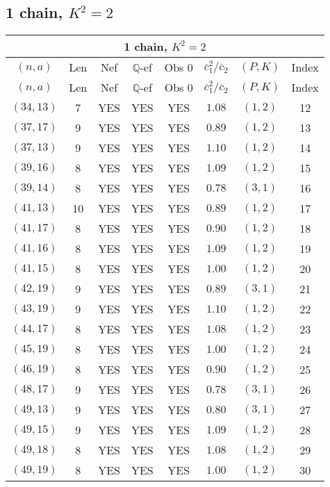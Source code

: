 \subsection{1 chain, $K^2 = 2$}
\begin{longtable}{|c|c|c|c|c|c|c|c|}
\hline
\multicolumn{8}{|c|}{1 chain, $K^2 = 2$}\\
\hline
$(n,a)$ & Len & Nef & $\mathbb Q$-ef & Obs 0 & $\overline c_1^2 / \overline c_2$ & $(P,K)$ & Index\\
\hline
\endfirsthead

\hline
$(n,a)$ & Len & Nef & $\mathbb Q$-ef & Obs 0 & $\overline c_1^2 / \overline c_2$ & $(P,K)$ & Index\\
\hline
\endhead
\hline
\endfoot

$(34,13)$ & 7 & YES & YES & YES & $1.08$ & $(1,2)$ & 12\\
$(37,17)$ & 9 & YES & YES & YES & $0.89$ & $(1,2)$ & 13\\
$(37,13)$ & 9 & YES & YES & YES & $1.10$ & $(1,2)$ & 14\\
$(39,16)$ & 8 & YES & YES & YES & $1.09$ & $(1,2)$ & 15\\
$(39,14)$ & 8 & YES & YES & YES & $0.78$ & $(3,1)$ & 16\\
$(41,13)$ & 10 & YES & YES & YES & $0.89$ & $(1,2)$ & 17\\
$(41,17)$ & 8 & YES & YES & YES & $0.90$ & $(1,2)$ & 18\\
$(41,16)$ & 8 & YES & YES & YES & $1.09$ & $(1,2)$ & 19\\
$(41,15)$ & 8 & YES & YES & YES & $1.00$ & $(1,2)$ & 20\\
$(42,19)$ & 9 & YES & YES & YES & $0.89$ & $(3,1)$ & 21\\
$(43,19)$ & 9 & YES & YES & YES & $1.10$ & $(1,2)$ & 22\\
$(44,17)$ & 8 & YES & YES & YES & $1.08$ & $(1,2)$ & 23\\
$(45,19)$ & 8 & YES & YES & YES & $1.00$ & $(1,2)$ & 24\\
$(46,19)$ & 8 & YES & YES & YES & $0.90$ & $(1,2)$ & 25\\
$(48,17)$ & 9 & YES & YES & YES & $0.78$ & $(3,1)$ & 26\\
$(49,13)$ & 9 & YES & YES & YES & $0.80$ & $(3,1)$ & 27\\
$(49,15)$ & 9 & YES & YES & YES & $1.09$ & $(1,2)$ & 28\\
$(49,18)$ & 8 & YES & YES & YES & $1.08$ & $(1,2)$ & 29\\
$(49,19)$ & 8 & YES & YES & YES & $1.00$ & $(1,2)$ & 30\\

\end{longtable}
